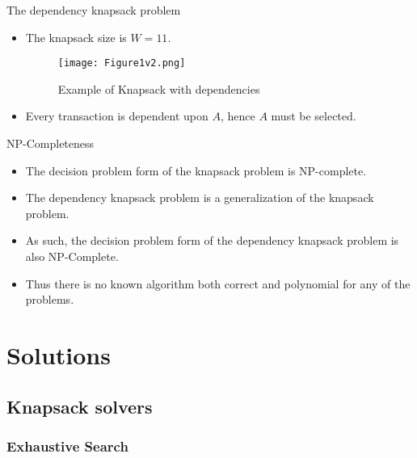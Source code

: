\documentclass{beamer}
\begin{document}
\begin {frame}{The dependency knapsack problem} %
    \begin{example}
    \begin{itemize}
        \item {The knapsack size is $W=11$.}
        \begin{figure}
            \centering
            \texttt{[image: Figure1v2.png]}
            \caption{Example of Knapsack with dependencies}
        \end{figure}
        \item {Every transaction is dependent upon $A$, hence $A$ must be 
        selected.} 
    \end{itemize}
    \end{example}
\end{frame}
\begin{frame}{NP-Completeness}
    \begin{itemize}
        \item {The decision problem form of the knapsack problem is 
        NP-complete.}
        \item {The dependency knapsack problem is a generalization of the 
        knapsack problem.}
        \item {As such, the decision problem form of the dependency knapsack
         problem is also NP-Complete.}
        \item {Thus there is no known algorithm both correct and polynomial
        for any of the problems.}
    \end{itemize}
\end{frame}

\section {Solutions}
\subsection* {Knapsack solvers}
\subsubsection* {Exhaustive Search}
\end{document}

